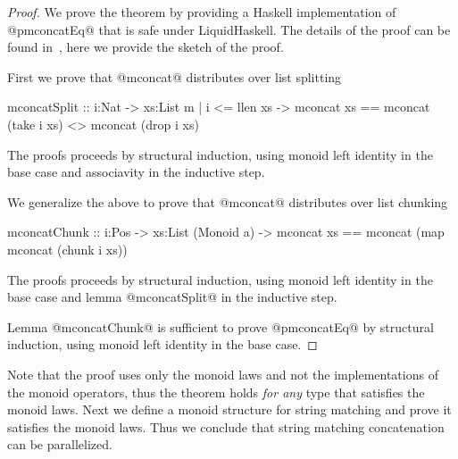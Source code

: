 \begin{proof}
We prove the theorem by providing a Haskell implementation of @pmconcatEq@
that is safe under LiquidHaskell. The details of the proof can be found in~\cite{implementation}, 
here we provide the sketch of the proof. 

First we prove that @mconcat@ distributes over list splitting
\begin{code}
mconcatSplit 
  :: i:Nat -> xs:{List m | i <= llen xs} 
  -> { mconcat xs == mconcat (take i xs) 
                 <> mconcat (drop i xs) }
\end{code}
%
The proofs proceeds by structural induction, using monoid left identity in the base case
and associavity in the inductive step.

We generalize the above
to prove that @mconcat@ distributes over list chunking
\begin{code}
mconcatChunk 
  :: i:Pos -> xs:List (Monoid a) 
  -> { mconcat xs == mconcat (map mconcat (chunk i xs)) }
\end{code}
%
The proofs proceeds by structural induction, using monoid left identity in the base case
and lemma @mconcatSplit@ in the inductive step.

Lemma @mconcatChunk@ is sufficient to prove @pmconcatEq@ by structural induction, 
using monoid left identity in the base case. 
\cqed\end{proof}

Note that the proof uses only the monoid laws and not the implementations of the monoid
operators, thus the theorem holds \textit{for any} type that satisfies the monoid laws. 
%
Next we define a monoid structure for string matching and prove it satisfies the monoid laws. 
Thus we conclude that string matching concatenation can be parallelized. 
 

